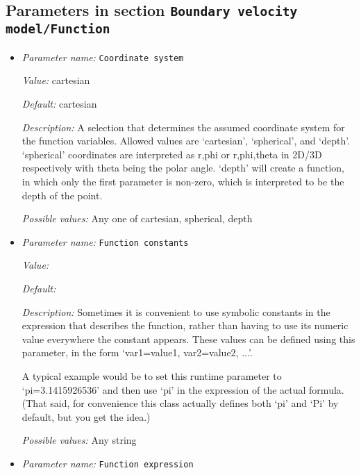 \subsection{Parameters in section \tt Boundary velocity model/Function}
\label{parameters:Boundary_20velocity_20model/Function}

\begin{itemize}
\item {\it Parameter name:} {\tt Coordinate system}
\label{parameters:Boundary velocity model/Function/Coordinate system}
\label{parameters:Boundary_20velocity_20model/Function/Coordinate_20system}


{\it Value:} cartesian


{\it Default:} cartesian


{\it Description:} A selection that determines the assumed coordinate system for the function variables. Allowed values are `cartesian', `spherical', and `depth'. `spherical' coordinates are interpreted as r,phi or r,phi,theta in 2D/3D respectively with theta being the polar angle. `depth' will create a function, in which only the first parameter is non-zero, which is interpreted to be the depth of the point.


{\it Possible values:} Any one of cartesian, spherical, depth
\item {\it Parameter name:} {\tt Function constants}
\label{parameters:Boundary velocity model/Function/Function constants}
\label{parameters:Boundary_20velocity_20model/Function/Function_20constants}


{\it Value:} 


{\it Default:} 


{\it Description:} Sometimes it is convenient to use symbolic constants in the expression that describes the function, rather than having to use its numeric value everywhere the constant appears. These values can be defined using this parameter, in the form `var1=value1, var2=value2, ...'.

A typical example would be to set this runtime parameter to `pi=3.1415926536' and then use `pi' in the expression of the actual formula. (That said, for convenience this class actually defines both `pi' and `Pi' by default, but you get the idea.)


{\it Possible values:} Any string
\item {\it Parameter name:} {\tt Function expression}
\label{parameters:Boundary velocity model/Function/Function expression}
\label{parameters:Boundary_20velocity_20model/Function/Function_20expression}



\end{itemize}
